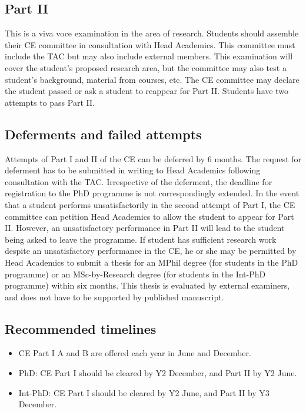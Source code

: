 \documentclass[a4paper]{extarticle}
\begin{document}
\subsection{Part II}
This is a viva voce examination in the area of research. Students should assemble
their CE committee in consultation with Head Academics. This committee must include the
TAC but may also include external members. This examination will cover the student’s
proposed research area, but the committee may also test a student’s background, material
from courses, etc. The CE committee may declare the student passed or ask a student to
reappear for Part II. Students have two attempts to pass Part II.

\subsection{Deferments and failed attempts}
Attempts of Part I and II of the CE can be deferred by 6
months. The request for deferment has to be submitted in writing to Head Academics
following consultation with the TAC. Irrespective of the deferment, the deadline for
registration to the PhD programme is not correspondingly extended. In the event that a
student performs unsatisfactorily in the second attempt of Part I, the CE committee can
petition Head Academics to allow the student to appear for Part II. However, an
unsatisfactory performance in Part II will lead to the student being asked to leave the
programme. If student has sufficient research work despite an unsatisfactory performance in
the CE, he or she may be permitted by Head Academics to submit a thesis for an MPhil
degree (for students in the PhD programme) or an MSc-by-Research degree (for students in
the Int-PhD programme) within six months. This thesis is evaluated by external examiners,
and does not have to be supported by published manuscript.

\subsection{Recommended timelines}

\begin{itemize}
    \item CE Part I A and B are offered each year in June and December.
    \item PhD: CE Part I should be cleared by Y2 December, and Part II by Y2 June.
    \item Int-PhD: CE Part I should be cleared by Y2 June, and Part II by Y3 December.
\end{itemize}
\end{document}
